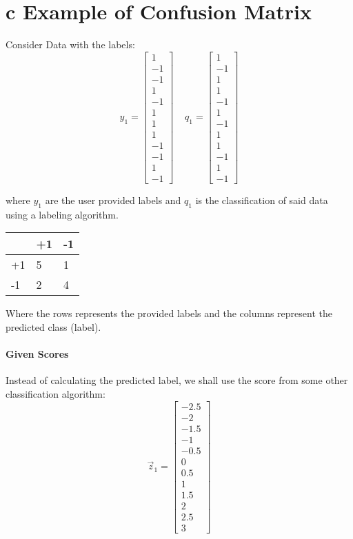 \documentclass[12pt]{book}
\begin{document}
\section*{c Example of Confusion Matrix}
Consider Data with the labels:
\[y_1 = \begin{bmatrix} 1\\-1\\-1\\1\\-1\\1\\1\\1\\-1\\-1\\1\\-1\end{bmatrix}\;\;\;\;q_1 = \begin{bmatrix} 1\\-1\\1\\1\\-1\\1\\-1\\1\\1\\-1\\1\\-1\end{bmatrix}\]

where $y_1$ are the user provided labels and $q_1$ is the classification of said data 
using a labeling algorithm.
\begin{table}[h]
\centering
\begin{tabular}{@{}lll@{}}
\toprule
                       & +1 & -1 \\ \midrule
\multicolumn{1}{l}{+1} & 5  & 1  \\
\multicolumn{1}{l}{-1} & 2  & 4  \\ \bottomrule
\end{tabular}
\end{table}
Where the rows represents the provided labels and the columns represent the predicted
class (label).

\paragraph{Given Scores}
Instead of calculating the predicted label, we shall use the score from some other classification
algorithm:
\[\vec z_1 = \begin{bmatrix} -2.5\\-2\\-1.5\\-1\\-0.5\\0\\0.5\\1\\1.5\\2\\2.5\\3\end{bmatrix}\]
\end{document}
